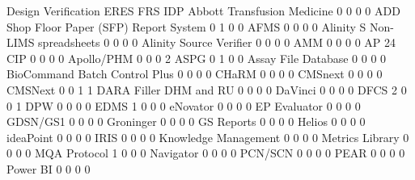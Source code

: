 \documentclass{article}
\begin{document}
\begin{Schunk}
\begin{Soutput}
                                           Design Verification ERES FRS IDP
  Abbott Transfusion Medicine                                0    0   0   0
  ADD Shop Floor Paper (SFP) Report System                   0    1   0   0
  AFMS                                                       0    0   0   0
  Alinity S Non-LIMS spreadsheets                            0    0   0   0
  Alinity Source Verifier                                    0    0   0   0
  AMM                                                        0    0   0   0
  AP 24 CIP                                                  0    0   0   0
  Apollo/PHM                                                 0    0   0   2
  ASPG                                                       0    1   0   0
  Assay File Database                                        0    0   0   0
  BioCommand Batch Control Plus                              0    0   0   0
  CHaRM                                                      0    0   0   0
  CMSnext                                                    0    0   0   0
  CMSNext                                                    0    0   1   1
  DARA Filler DHM and RU                                     0    0   0   0
  DaVinci                                                    0    0   0   0
  DFCS                                                       2    0   0   1
  DPW                                                        0    0   0   0
  EDMS                                                       1    0   0   0
  eNovator                                                   0    0   0   0
  EP Evaluator                                               0    0   0   0
  GDSN/GS1                                                   0    0   0   0
  Groninger                                                  0    0   0   0
  GS Reports                                                 0    0   0   0
  Helios                                                     0    0   0   0
  ideaPoint                                                  0    0   0   0
  IRIS                                                       0    0   0   0
  Knowledge Management                                       0    0   0   0
  Metrics Library                                            0    0   0   0
  MQA Protocol                                               1    0   0   0
  Navigator                                                  0    0   0   0
  PCN/SCN                                                    0    0   0   0
  PEAR                                                       0    0   0   0
  Power BI                                                   0    0   0   0

\end{Soutput}
\end{Schunk}
\end{document}
